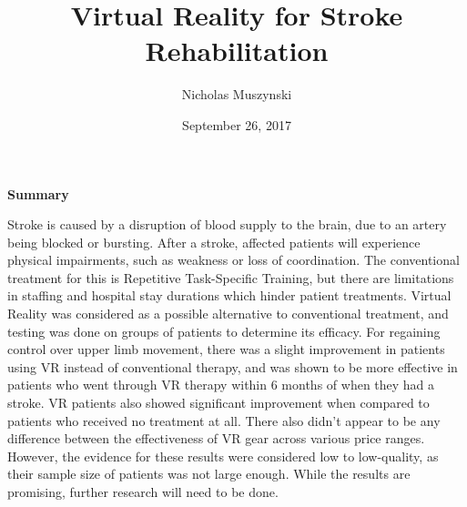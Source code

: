 \documentclass{article}
\begin{document}
\title{Virtual Reality for Stroke Rehabilitation}
\author{Nicholas Muszynski}
\date{September 26, 2017}

\maketitle

\textbf{Summary}
\newline


Stroke is caused by a disruption of blood supply to the brain, due to an artery being blocked or bursting. 
After a stroke, affected patients will experience physical impairments, such as weakness or loss of coordination. 
The conventional treatment for this is Repetitive Task-Specific Training, but there are limitations in staffing and hospital stay durations which hinder patient treatments. 
Virtual Reality was considered as a possible alternative to conventional treatment, and testing was done on groups of patients to determine its efficacy. 
For regaining control over upper limb movement, there was a slight improvement in patients using VR instead of conventional therapy, and was shown to be more effective in patients who went through VR therapy within 6 months of when they had a stroke. 
VR patients also showed significant improvement when compared to patients who received no treatment at all. 
There also didn't appear to be any difference between the effectiveness of VR gear across various price ranges. 
However, the evidence for these results were considered low to low-quality, as their sample size of patients was not large enough. 
While the results are promising, further research will need to be done.


\nocite{article1cite}



\end{document}
